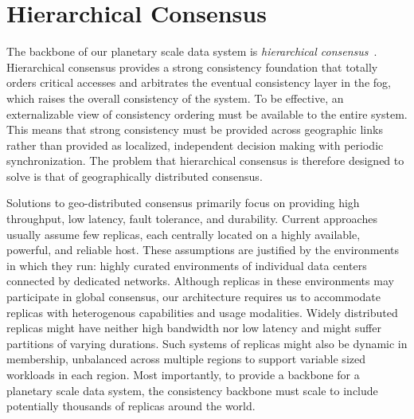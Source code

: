 
\renewcommand{\thechapter}{3}

\chapter{Hierarchical Consensus}
\label{ch:hierarchical_consensus}

The backbone of our planetary scale data system is \emph{hierarchical consensus}~\cite{hc_brief_announcement}.
Hierarchical consensus provides a strong consistency foundation that totally orders critical accesses and arbitrates the eventual consistency layer in the fog, which raises the overall consistency of the system.
To be effective, an externalizable view of consistency ordering must be available to the entire system.
This means that strong consistency must be provided across geographic links rather than provided as localized, independent decision making with periodic synchronization.
The problem that hierarchical consensus is therefore designed to solve is that of geographically distributed consensus.

Solutions to geo-distributed consensus primarily focus on providing high throughput, low latency, fault tolerance, and durability.
Current approaches \cite{epaxos,mencius,calvindb,spaxos,sutra_fast_2011,peluso_making_2016} usually assume few replicas, each centrally located on a highly available, powerful, and reliable host.
These assumptions are justified by the environments in which they run: highly curated environments of individual data centers connected by dedicated networks.
Although replicas in these environments may participate in global consensus, our architecture requires us to accommodate replicas with heterogenous capabilities and usage modalities.
Widely distributed replicas might have neither high bandwidth nor low latency and might suffer partitions of varying durations.
Such systems of replicas might also be dynamic in membership, unbalanced across multiple regions to support variable sized workloads in each region.
Most importantly, to provide a backbone for a planetary scale data system, the consistency backbone must scale to include potentially thousands of replicas around the world.

